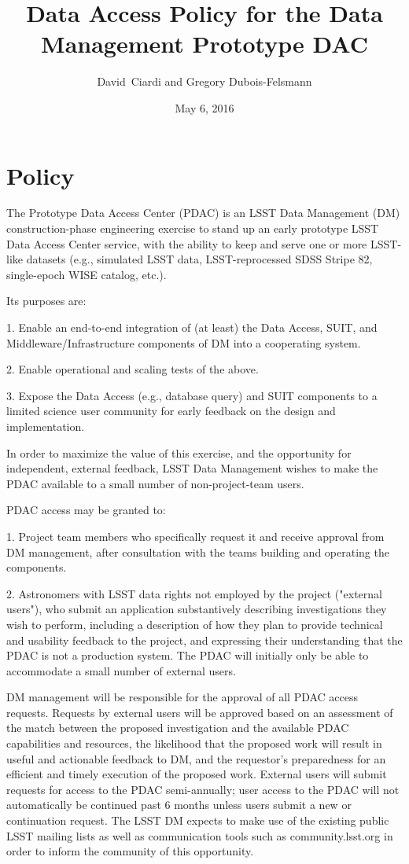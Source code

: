 \documentclass[DM,lsstdraft,toc]{lsstdoc}
\title[Data Access Policy for PDAC]{Data Access Policy for the Data Management Prototype DAC}
\author{David~Ciardi and Gregory Dubois-Felsmann}
\date{May 6, 2016}
\begin{document}
\maketitle

\section{Policy}

The Prototype Data Access Center (PDAC) is an LSST Data Management (DM) construction-phase engineering exercise to stand up an early prototype LSST Data Access Center service, with the ability to keep and serve one or more LSST-like datasets (e.g., simulated LSST data, LSST-reprocessed SDSS Stripe 82, single-epoch WISE catalog, etc.).

Its purposes are:

1. Enable an end-to-end integration of (at least) the Data Access, SUIT, and Middleware/Infrastructure components of DM into a cooperating system.

2. Enable operational and scaling tests of the above.

3. Expose the Data Access (e.g., database query) and SUIT components to a limited science user community for early feedback on the
design and implementation.

In order to maximize the value of this exercise, and the opportunity for independent, external feedback, LSST Data Management wishes to make the PDAC available to a small number of non-project-team users.

PDAC access may be granted to:

1. Project team members who specifically request it and receive approval from DM management, after consultation with the teams building and operating the components.

2. Astronomers with LSST data rights not employed by the project ("external users"), who submit an application substantively describing investigations they wish to perform, including a description of how they plan to provide technical and usability feedback to the project, and expressing their understanding that the PDAC is not a production system. The PDAC will initially only be able to accommodate a small number of external users.

DM management will be responsible for the approval of all PDAC access requests. Requests by external users will be approved based on an assessment of the match between the proposed investigation and the available PDAC capabilities and resources, the likelihood that the proposed work will result in useful and actionable feedback to DM, and the requestor's preparedness for an efficient and timely execution of the proposed work. External users will submit requests for access to the PDAC semi-annually; user access to the PDAC will not automatically be continued past 6 months unless users submit a new or continuation request. The LSST DM expects to make use of the existing public LSST mailing lists as well as communication tools such as community.lsst.org in order to inform the community of this opportunity.
\end{document}
